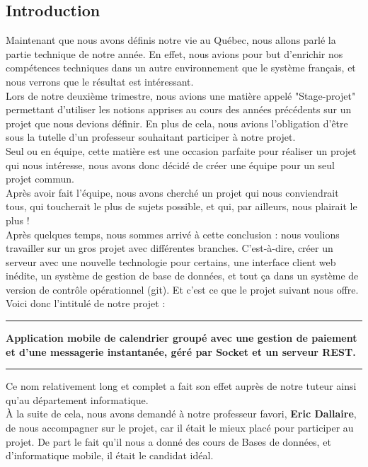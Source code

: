 \subsection{Introduction}

Maintenant que nous avons définis notre vie au Québec, nous allons parlé la partie technique de notre année. En effet, nous avions pour but d'enrichir nos compétences techniques dans un autre environnement que le système français, et nous verrons que le résultat est intéressant.
\\
Lors de notre deuxième trimestre, nous avions une matière appelé "Stage-projet" permettant d'utiliser les notions apprises au cours des années précédents sur un projet que nous devions définir. En plus de cela, nous avions l'obligation d'être sous la tutelle d'un professeur souhaitant participer à notre projet.\\

Seul ou en équipe, cette matière est une occasion parfaite pour réaliser un projet qui nous intéresse, nous avons donc décidé de créer une équipe pour un seul projet commun.\\

Après avoir fait l'équipe, nous avons cherché un projet qui nous conviendrait tous, qui toucherait le plus de sujets possible, et qui, par ailleurs, nous plairait le plus !\\

Après quelques temps, nous sommes arrivé à cette conclusion : nous voulions travailler sur un gros projet avec différentes branches. C'est-à-dire, créer un serveur avec une nouvelle technologie pour certains, une interface client web inédite, un système de gestion de base de données, et tout ça dans un système de version de contrôle opérationnel (git). Et c'est ce que le projet suivant nous offre. \\

Voici donc l'intitulé de notre projet : \\

\noindent
{\rule{\linewidth}{0.5mm} }
\begin{center}
\color{red}
    \textbf{Application mobile de calendrier groupé avec une gestion de paiement et d'une messagerie instantanée, géré par Socket et un serveur REST.}
\end{center}
\noindent
{\rule{\linewidth}{0.5mm} }

Ce nom relativement long et complet a fait son effet auprès de notre tuteur ainsi qu'au département informatique. 
\\
À la suite de cela, nous avons demandé à notre professeur favori, \textbf{Eric Dallaire}, de nous accompagner sur le projet, car il était le mieux placé pour participer au projet. De part le fait qu'il nous a donné des cours de Bases de données, et d'informatique mobile, il était le candidat idéal.\\

